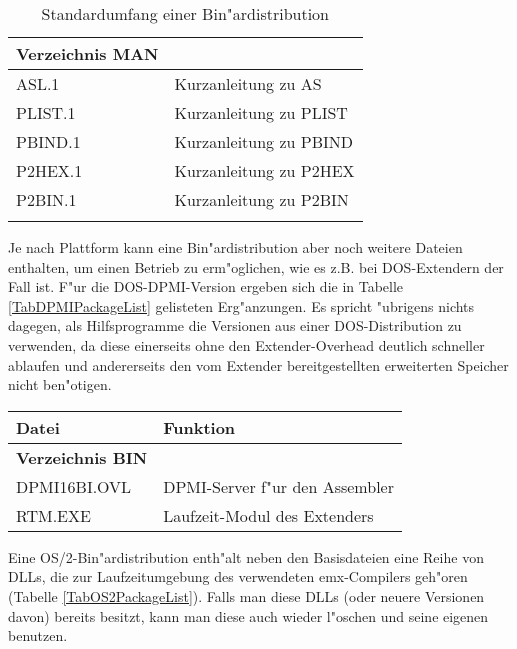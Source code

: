\documentclass[12pt,a4paper,twoside]{report}
\begin{document}
\begin{center}
\begin{longtable}{|l|l|}
\hline
{\bf Verzeichnis MAN} & \\
\hline
ASL.1             & Kurzanleitung zu AS \\
PLIST.1           & Kurzanleitung zu PLIST \\
PBIND.1           & Kurzanleitung zu PBIND \\
P2HEX.1           & Kurzanleitung zu P2HEX \\
P2BIN.1           & Kurzanleitung zu P2BIN \\
\hline
\caption{Standardumfang einer Bin"ardistribution
 \label{TabCommonPackageList}}
\end{longtable}\end{center}

Je nach Plattform kann eine Bin"ardistribution aber noch weitere Dateien
enthalten, um einen Betrieb zu erm"oglichen, wie es z.B. bei DOS-Extendern
der Fall ist.  F"ur die DOS-DPMI-Version  ergeben
sich die in Tabelle \ref{TabDPMIPackageList} gelisteten Erg"anzungen.  Es
spricht "ubrigens nichts dagegen, als Hilfsprogramme die Versionen aus
einer DOS-Distribution zu verwenden, da diese einerseits ohne den
Extender-Overhead deutlich schneller ablaufen und andererseits den
vom Extender bereitgestellten erweiterten Speicher nicht ben"otigen.

\begin{table*}[htp]
\begin{center}\begin{tabular}{|l|l|}
\hline
Datei             & Funktion \\
\hline
\hline
{\bf Verzeichnis BIN} & \\
\hline
DPMI16BI.OVL   & DPMI-Server f"ur den Assembler \\
RTM.EXE        & Laufzeit-Modul des Extenders \\
\hline
\end{tabular}\end{center}
\caption{Zus"atzliche Dateien in einer DPMI-Bin"ardistribution
         \label{TabDPMIPackageList}}
\end{table*}

Eine OS/2-Bin"ardistribution  enth"alt neben den
Basisdateien eine Reihe von DLLs, die zur Laufzeitumgebung des verwendeten
emx-Compilers geh"oren (Tabelle \ref{TabOS2PackageList}).  Falls man diese
DLLs (oder neuere Versionen davon) bereits besitzt, kann man diese auch
wieder l"oschen und seine eigenen benutzen.
\end{document}

